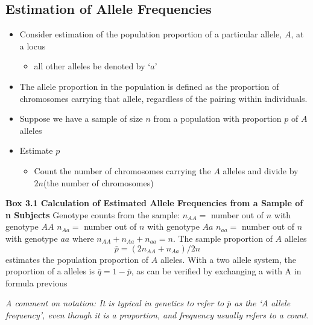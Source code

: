 \documentclass[a4paper,twoside,11pt]{article}
\begin{document}
\subsection{Estimation of Allele Frequencies}
\begin{itemize}
    \item Consider estimation of the population proportion of a particular allele, $A$, at a locus
    \begin{itemize}
        \item all other alleles be denoted by ‘$a$’
    \end{itemize}
    \item The allele proportion in the population is defined as the proportion of chromosomes carrying that allele, regardless of the pairing within individuals.
    \item Suppose we have a sample of size $n$ from a population with proportion $p$ of $A$ alleles
    \item Estimate $p$
    \begin{itemize}
        \item Count the number of chromosomes carrying the $A$ alleles and divide by $2n$(the number of chromosomes)
    \end{itemize}
\end{itemize}
\begin{shaded*}
\noindent \textbf{Box 3.1 Calculation of Estimated Allele Frequencies from a Sample of n Subjects}
\newline
\newline
Genotype counts from the sample:
\newline
\newline
$n_{AA} = $ number out of $n$ with genotype $AA$
\newline
$n_{Aa} = $ number out of $n$ with genotype $Aa$
\newline
$n_{aa} = $ number out of $n$ with genotype $aa$
\newline
\newline
where $n_{AA} + n_{Aa} + n_{aa} = n$. The sample proportion of $A$ alleles
$$
\bar{p} = (2n_{AA} + n_{Aa}) /2n
$$
estimates the population proportion of $A$ alleles. With a two allele system, the proportion of a alleles is $\bar{q} = 1- \bar{p}$, as can be verified by exchanging a with A in formula previous
\end{shaded*}
\textcolor{NavyBlue}{\textit{A comment on notation: It is typical in genetics to refer to $\bar{p}$ as the ‘$A$ allele frequency’, even though it is a proportion, and frequency usually refers to a count.}}
\end{document}
